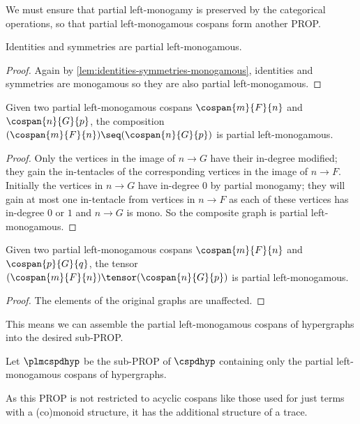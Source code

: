 We must ensure that partial left-monogamy is preserved by the categorical
operations, so that partial left-monogamous cospans form another PROP.

\begin{lemma}\label{lem:partial-monogamous-id-sym}
    Identities and symmetries are partial left-monogamous.
\end{lemma}
\begin{proof}
    Again by \cref{lem:identities-symmetries-monogamous}, identities and
    symmetries are monogamous so they are also partial left-monogamous.
\end{proof}

\begin{lemma}
    Given two partial left-monogamous cospans
    \(\cospan{m}{F}{n}\) and
    \(\cospan{n}{G}{p}\), the composition \(
    (\cospan{m}{F}{n})
    \seq
    (\cospan{n}{G}{p})
    \) is partial left-monogamous.
\end{lemma}
\begin{proof}
    Only the vertices in the image of \(n \to G\) have their in-degree modified;
    they gain the in-tentacles of the corresponding vertices in the image of
    \(n \to F\).
    Initially the vertices in \(n \to G\) have in-degree \(0\) by partial
    monogamy; they will gain at most one in-tentacle from vertices in
    \(n \to F\) as each of these vertices has in-degree \(0\) or \(1\) and
    \(n \to G\) is mono.
    So the composite graph is partial left-monogamous.
\end{proof}

\begin{lemma}
    Given two partial left-monogamous cospans \(\cospan{m}{F}{n}\)
    and \(\cospan{p}{G}{q}\), the tensor \(
    (\cospan{m}{F}{n})
    \tensor
    (\cospan{n}{G}{p})
    \) is partial left-monogamous.
\end{lemma}
\begin{proof}
    The elements of the original graphs are unaffected.
\end{proof}

This means we can assemble the partial left-monogamous cospans of hypergraphs
into the desired sub-PROP.

\begin{definition}
    Let \(\plmcspdhyp\) be the sub-PROP of \(\cspdhyp\) containing only the
    partial left-monogamous cospans of hypergraphs.
\end{definition}

As this PROP is not restricted to acyclic cospans like those used for just
terms with a (co)monoid structure, it has the additional structure of a trace.

